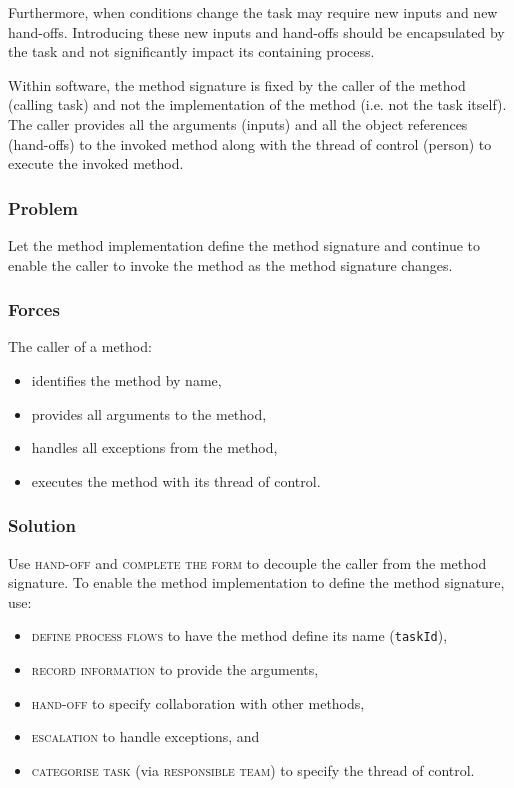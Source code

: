 \documentclass[prodmode]{style/acmlarge}
\begin{document}
Furthermore, when conditions change the task may require new inputs and new
hand-offs.  Introducing these new inputs and hand-offs should be encapsulated by
the task and not significantly impact its containing process.

Within software, the method signature is fixed by the caller of the method
(calling task) and not the implementation of the method (i.e. not the task
itself).  The caller provides all the arguments (inputs) and all the
object references (hand-offs) to the invoked method along with the thread of
control (person) to execute the invoked method.

\subsubsection*{\textbf{Problem}} Let the method implementation define the method
signature and continue to enable the caller to invoke the method as the method
signature changes.

\subsubsection*{Forces} The caller of a method:
\begin{itemize}
  \item identifies the method by name,
  \item provides all arguments to the method,
  \item handles all exceptions from the method,
  \item executes the method with its thread of control.
\end{itemize}

\subsubsection*{\textbf{Solution}} Use \textsc{hand-off} and \textsc{complete the form}
to decouple the caller from the method signature.  To enable the method
implementation to define the method signature, use:
\begin{itemize}
  \item \textsc{define process flows} to have the method define its name (\texttt{taskId}),
  \item \textsc{record information} to provide the arguments,
  \item \textsc{hand-off} to specify collaboration with other methods,
  \item \textsc{escalation} to handle exceptions, and
  \item \textsc{categorise task} (via \textsc{responsible team}) to specify the thread of control.    
\end{itemize}
\end{document}
